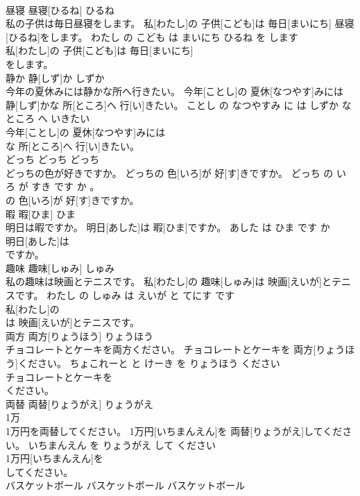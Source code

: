 \documentclass[8pt]{extreport}
\begin{document}
\begin{CJK}{UTF8}{min}
\\	昼寝	昼寝[ひるね]	ひるね	
\\	私の子供は毎日昼寝をします。	私[わたし]の 子供[こども]は 毎日[まいにち] 昼寝[ひるね]をします。	わたし の こども は まいにち ひるね を します	
\\	私[わたし]の 子供[こども]は 毎日[まいにち]
\\	をします。		
\\	静か	静[しず]か	しずか	
\\	今年の夏休みには静かな所へ行きたい。	今年[ことし]の 夏休[なつやす]みには 静[しず]かな 所[ところ]へ 行[い]きたい。	ことし の なつやすみ に は しずか な ところ へ いきたい	
\\	今年[ことし]の 夏休[なつやす]みには
\\	な 所[ところ]へ 行[い]きたい。		
\\	どっち	どっち	どっち	
\\	どっちの色が好きですか。	どっちの 色[いろ]が 好[す]きですか。	どっち の いろ が すき です か 。	
\\	の 色[いろ]が 好[す]きですか。		
\\	暇	暇[ひま]	ひま	
\\	明日は暇ですか。	明日[あした]は 暇[ひま]ですか。	あした は ひま です か	
\\	明日[あした]は
\\	ですか。		
\\	趣味	趣味[しゅみ]	しゅみ	
\\	私の趣味は映画とテニスです。	私[わたし]の 趣味[しゅみ]は 映画[えいが]とテニスです。	わたし の しゅみ は えいが と てにす です	
\\	私[わたし]の
\\	は 映画[えいが]とテニスです。		
\\	両方	両方[りょうほう]	りょうほう	
\\	チョコレートとケーキを両方ください。	チョコレートとケーキを 両方[りょうほう]ください。	ちょこれーと と けーき を りょうほう ください	
\\	チョコレートとケーキを
\\	ください。		
\\	両替	両替[りょうがえ]	りょうがえ	
\\	1万 
\\	1万円を両替してください。	1万円[いちまんえん]を 両替[りょうがえ]してください。	いちまんえん を りょうがえ して ください	
\\	1万円[いちまんえん]を
\\	してください。		
\\	バスケットボール	バスケットボール	バスケットボール	

\end{CJK}
\end{document}
